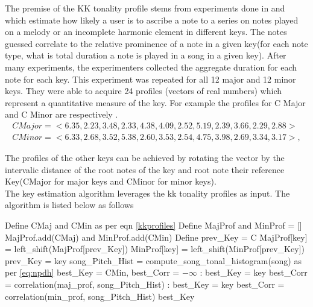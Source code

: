 \noindent The premise of the KK tonality profile stems from experiments done in \cite{kkTonalityKeyFinding} and \cite{kkcognitive} which estimate how likely a user is to ascribe a note to a series on notes played on a melody or an incomplete harmonic element in different keys. The notes guessed correlate to the relative prominence of a note in a given key(for each note type, what is total duration a note is played in a song in a given key). After many experiments, the experimenters collected the aggregate duration for each note for each key. This experiment was  repeated for all 12 major and 12 minor keys. They were able to acquire 24 profiles (vectors of real numbers) which represent a quantitative measure of the key. For example the profiles for C Major and C Minor are respectively \cite{kkcognitive}.
\begin{equation} \label{kkprofiles}
\begin{aligned}
  CMajor = <6.35, 2.23, 3.48, 2.33, 4.38, 4.09, 2.52, 5.19, 2.39, 3.66, 2.29, 2.88> \\
  CMinor = <6.33, 2.68, 3.52, 5.38, 2.60, 3.53, 2.54, 4.75, 3.98, 2.69, 3.34, 3.17>, 
\end{aligned}
\end{equation}

\noindent The profiles of the other keys can be achieved by rotating the vector by the intervalic distance of the root notes of the key and root note their reference Key(CMajor for major keys and CMinor for minor keys). \\

\noindent The key estimation algorithm leverages the kk tonality profiles as input. The algorithm is listed below as follows \cite{kkTonalityKeyFinding}

\begin{algorithm}

\label{CHalgorithm}
\begin{algorithmic}[1]
 {}
\State Define CMaj and CMin as per eqn \ref{kkprofiles}
\State Define MajProf and MinProf = [] %
\State MajProf.add(CMaj) and MinProf.add(CMin)
\State Define prev\_Key = C 
\State MajProf[key] = left\_shift(MajProf[prev\_Key])
\State MinProf[key] = left\_shift(MinProf[prev\_Key])
\State prev\_Key = key
\EndFor
\State song\_Pitch\_Hist = compute\_song\_tonal\_histogram(song) as per \ref{eq:npdh}
\State best\_Key = CMin, best\_Corr = $-\infty$
:
\State best\_Key = key
\State best\_Corr = correlation(maj\_prof, song\_Pitch\_Hist)
\EndIf
\EndFor
{}:
\State best\_Key = key
\State best\_Corr = correlation(min\_prof, song\_Pitch\_Hist)
\EndIf
\EndFor
\Return best\_Key
\EndProcedure
\end{algorithmic}
\end{algorithm}

